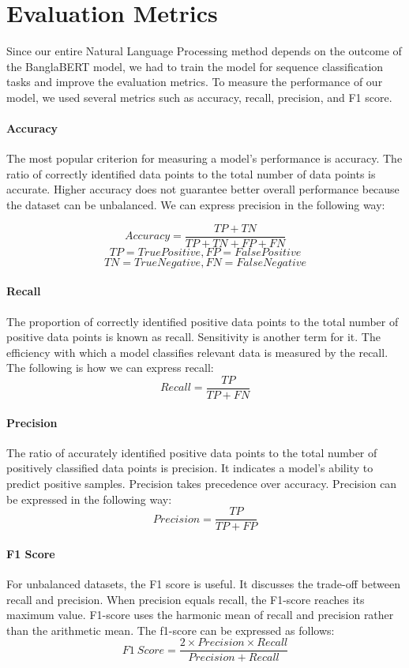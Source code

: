 \chapter{Evaluation Metrics}\label{eval_metrics}

Since our entire Natural Language Processing method depends on the outcome of the BanglaBERT model, we had to train the model for sequence classification tasks and improve the evaluation metrics. To measure the performance of our model, we used several metrics such as accuracy, recall, precision, and F1 score.

\subsubsection{Accuracy}
The most popular criterion for measuring a model's performance is accuracy. The ratio of correctly identified data points to the total number of data points is accurate. Higher accuracy does not guarantee better overall performance because the dataset can be unbalanced. We can express precision in the following way:

$$ Accuracy = \frac{TP + TN}{TP + TN + FP + FN} $$
$$ TP = True Positive, FP = False Positive $$
$$ TN = True Negative, FN = False Negative $$

\subsubsection{Recall}
The proportion of correctly identified positive data points to the total number of positive data points is known as recall. Sensitivity is another term for it. The efficiency with which a model classifies relevant data is measured by the recall. The following is how we can express recall:
$$ Recall = \frac{TP}{TP + FN} $$

\subsubsection{Precision}
The ratio of accurately identified positive data points to the total number of positively classified data points is precision. It indicates a model's ability to predict positive samples. Precision takes precedence over accuracy. Precision can be expressed in the following way:
$$ Precision = \frac{TP}{TP + FP} $$

\subsubsection{F1 Score}
For unbalanced datasets, the F1 score is useful. It discusses the trade-off between recall and precision. When precision equals recall, the F1-score reaches its maximum value. F1-score uses the harmonic mean of recall and precision rather than the arithmetic mean. The f1-score can be expressed as follows:
$$ F1\ Score = \frac{2 \times Precision \times Recall}{Precision + Recall} $$



